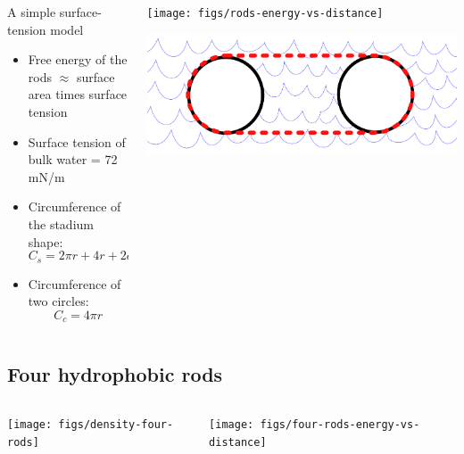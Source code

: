 \documentclass[compress]{beamer}
\begin{document}
\begin{frame}[fragile]{}
  \begin{columns}
    \begin{column}{0.5\columnwidth}
      \begin{block}{A simple surface-tension model}
        \begin{itemize}
        \item Free energy of the rods $\approx$ surface area times surface tension
        \item Surface tension of bulk water = 72 mN/m
        \item Circumference of the stadium shape:
          \begin{equation*}
            C_{s} = 2\pi r +4r+2d
          \end{equation*}
        \item Circumference of two circles:
          \begin{equation*}
            C_{c} = 4\pi r
          \end{equation*}
        \end{itemize}
      \end{block}
    \end{column}
    \begin{column}{0.5\columnwidth}
      \texttt{[image: figs/rods-energy-vs-distance]}

      \vfill

      \includegraphics[width=\columnwidth]{figs/stadium-vs-circles}
    \end{column}
  \end{columns}
\end{frame}

\subsection{Four hydrophobic rods}

\begin{frame}[fragile]{}
  \begin{columns}
    \begin{column}{0.5\columnwidth}
      \texttt{[image: figs/density-four-rods]}
    \end{column}
    \begin{column}{0.5\columnwidth}
    \texttt{[image: figs/four-rods-energy-vs-distance]}
    \end{column}
  \end{columns}
\end{frame}
\end{document}
